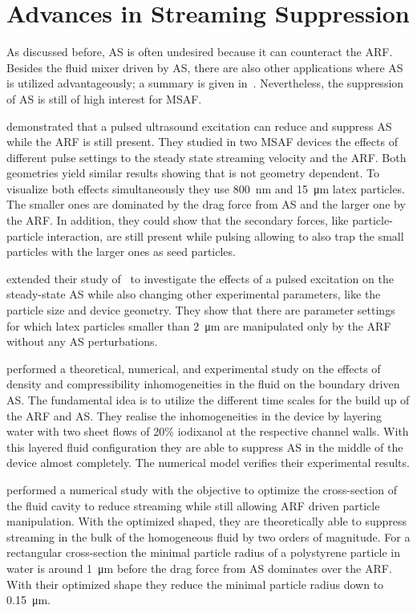 \section{Advances in Streaming Suppression}

As discussed before, AS is often undesired because it can counteract the ARF. 
Besides the fluid mixer driven by AS, there are also other applications where 
AS is utilized advantageously; a summary is given in~\cite{Wiklund2012a}. 
Nevertheless, the suppression of AS is still of high interest for MSAF.

 demonstrated that a pulsed ultrasound excitation can reduce 
and suppress AS while the ARF is still present. They studied in two MSAF 
devices the effects of different pulse settings to the steady state streaming 
velocity and the ARF. Both geometries yield similar results showing that is not 
geometry dependent. To visualize both effects simultaneously they use 
\SI{800}{\nm} and \SI{15}{\um} latex particles. The smaller ones are dominated 
by the drag force from AS and the larger one by the ARF. In addition, they 
could show that the secondary forces, like particle-particle interaction, are 
still present while pulsing allowing to also trap the small particles with the 
larger ones as seed particles.

 extended their study of~\cite{Hoyos2013} to investigate the 
effects of a pulsed excitation on the steady-state AS while also changing other 
experimental parameters, like the particle size and device geometry. They show 
that there are parameter settings for which latex particles smaller than 
\SI{2}{\um} are manipulated only by the ARF without any AS perturbations.

 performed a theoretical, numerical, and experimental study 
on the effects of density and compressibility inhomogeneities in the fluid on 
the boundary driven AS. The fundamental idea is to utilize the different time 
scales for the build up of the ARF and AS. They realise the inhomogeneities in 
the device by layering water with two sheet flows of 20\% iodixanol at the 
respective channel walls. With this layered fluid configuration they are able 
to suppress AS in the middle of the device almost completely. The numerical 
model verifies their experimental results.

 performed a numerical study with the objective to optimize the 
cross-section of the fluid cavity to reduce streaming while still allowing ARF 
driven particle manipulation. With the optimized shaped, they are theoretically 
able to suppress streaming in the bulk of the homogeneous fluid by two orders 
of magnitude. For a rectangular cross-section the minimal particle radius of a 
polystyrene particle in water is around \SI{1}{\um} before the drag force from 
AS dominates over the ARF. With their optimized shape they reduce the minimal 
particle radius down to \SI{0.15}{\um}.

